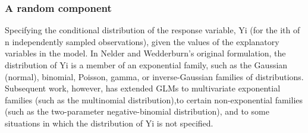 \subsubsection{A random component}
Specifying the conditional distribution of the response variable, Yi (for the ith of n independently sampled observations), given the values of the explanatory variables in the model. In Nelder and Wedderburn’s original formulation, the distribution of Yi is a member of an exponential family, such as the Gaussian (normal), binomial, Poisson, gamma, or inverse-Gaussian families of distributions. Subsequent work, however, has extended GLMs to multivariate exponential families (such as the multinomial distribution),to certain non-exponential families (such as the two-parameter negative-binomial distribution), and to some situations in which the distribution of Yi is not specified.
